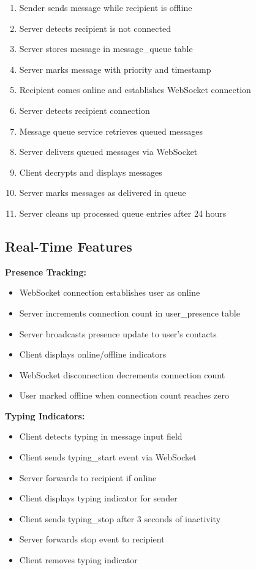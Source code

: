 \begin{enumerate}
    \item Sender sends message while recipient is offline
    \item Server detects recipient is not connected
    \item Server stores message in message\_queue table
    \item Server marks message with priority and timestamp
    \item Recipient comes online and establishes WebSocket connection
    \item Server detects recipient connection
    \item Message queue service retrieves queued messages
    \item Server delivers queued messages via WebSocket
    \item Client decrypts and displays messages
    \item Server marks messages as delivered in queue
    \item Server cleans up processed queue entries after 24 hours
\end{enumerate}

\subsection{Real-Time Features}

\textbf{Presence Tracking:}
\begin{itemize}
    \item WebSocket connection establishes user as online
    \item Server increments connection count in user\_presence table
    \item Server broadcasts presence update to user's contacts
    \item Client displays online/offline indicators
    \item WebSocket disconnection decrements connection count
    \item User marked offline when connection count reaches zero
\end{itemize}

\textbf{Typing Indicators:}
\begin{itemize}
    \item Client detects typing in message input field
    \item Client sends typing\_start event via WebSocket
    \item Server forwards to recipient if online
    \item Client displays typing indicator for sender
    \item Client sends typing\_stop after 3 seconds of inactivity
    \item Server forwards stop event to recipient
    \item Client removes typing indicator
\end{itemize}

